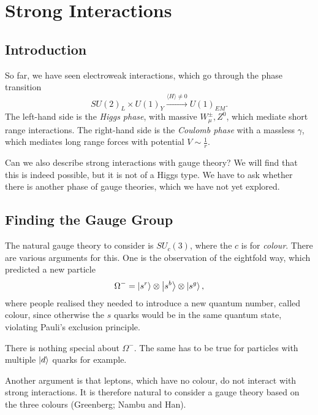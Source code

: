 
\chapter{Strong Interactions}%
\label{cha:strong_interactions}

\section{Introduction}%
\label{sec:strong-introduction}

So far, we have seen electroweak interactions, which go through the phase transition
\begin{equation}
  SU(2)_L \times U(1)_Y \xrightarrow{\langle H \rangle \neq 0 } U(1)_{EM}.
\end{equation}
The left-hand side is the \emph{Higgs phase}, with massive $W^{\pm}_\mu, Z^0$, which mediate short range interactions.
The right-hand side is the \emph{Coulomb phase} with a massless $\gamma$, which mediates long range forces with potential $V \sim \frac{1}{r}$.

Can we also describe strong interactions with gauge theory?
We will find that this is indeed possible, but it is not of a Higgs type.
We have to ask whether there is another phase of gauge theories, which we have not yet explored.

\section{Finding the Gauge Group}%
\label{sec:finding_the_gauge_group}

The natural gauge theory to consider is $SU_c(3)$, where the $c$ is for \emph{colour}.
There are various arguments for this.
One is the observation of the eightfold way, which predicted a new particle
\begin{equation}
  \Omega^- = \ket{s^r} \otimes \ket{s^b} \otimes \ket{s^g},
\end{equation}
where people realised they needed to introduce a new quantum number, called colour, since otherwise the $s$ quarks would be in the same quantum state, violating Pauli's exclusion principle.
\begin{remark}
  There is nothing special about $\Omega^-$. The same has to be true for particles with multiple $\ket{d}$ quarks for example.
\end{remark}
Another argument is that leptons, which have no colour, do not interact with strong interactions.
It is therefore natural to consider a gauge theory based on the three colours (Greenberg; Nambu and Han).

